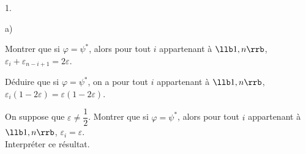 \documentclass[11pt]{article}%
\begin{document}
\begin{noliste}{1.}
\begin{noliste}{a)}
  \item Montrer que si $\varphi= \psi^*$, alors pour tout $i$ 
  appartenant à $\llb 1,n \rrb$, $\varepsilon_i+ \varepsilon_{n-i+1}=2 
  \varepsilon$. 
  
  

  
  \item Déduire que si $\varphi= \psi^*$, on a pour tout $i$ 
  appartenant à $\llb 1,n \rrb$, $\varepsilon_i(1-2\varepsilon)= 
  \varepsilon(1-2\varepsilon)$.
  
  
  
  

  
  \item On suppose que $\varepsilon \neq \dfrac{1}{2}$.  Montrer que si 
  $\varphi= \psi^*$, alors pour tout $i$ appartenant à $\llb 1,n \rrb$, 
  $\varepsilon_i=\varepsilon$. \\[.1cm]
  Interpréter ce résultat.
  
  

 \end{noliste}
\end{noliste}
\end{document}
